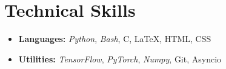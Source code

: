 \section*{Technical Skills}
\begin{itemize}[itemsep=0mm]

    \item \textbf{Languages:} \textit{Python}, \textit{Bash}, C, \LaTeX, HTML, CSS
    \item \textbf{Utilities:} \textit{TensorFlow}, \textit{PyTorch}, \textit{Numpy}, Git, Asyncio

\end{itemize}
